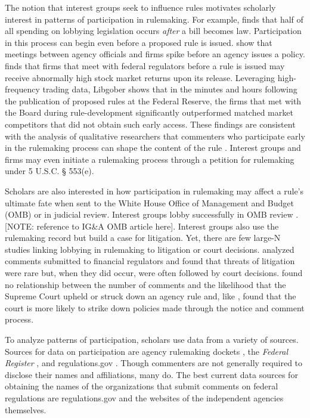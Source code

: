 \documentclass[
      12pt,
        ]{article}
\begin{document}
The notion that interest groups seek to influence rules motivates
scholarly interest in patterns of participation in rulemaking. For
example, \citet{YouJOP2017} finds that half of all spending on lobbying
legislation occurs \emph{after} a bill becomes law. Participation in
this process can begin even before a proposed rule is issued.
\citet{deFigureidoKimICC2004} show that meetings between agency
officials and firms spike before an agency issues a policy.
\citet{LibgoberQJPS} finds that firms that meet with federal regulators
before a rule is issued may receive abnormally high stock market returns
upon its release. Leveraging high-frequency trading data, Libgober shows
that in the minutes and hours following the publication of proposed
rules at the Federal Reserve, the firms that met with the Board during
rule-development significantly outperformed matched market competitors
that did not obtain such early access. These findings are consistent
with the analysis of qualitative researchers that commenters who
participate early in the rulemaking process can shape the content of the
rule \citep{NaughtonJPAM2009}. Interest groups and firms may even
initiate a rulemaking process through a petition for rulemaking under 5
U.S.C. § 553(e).

Scholars are also interested in how participation in rulemaking may
affect a rule's ultimate fate when sent to the White House Office of
Management and Budget (OMB) or in judicial review. Interest groups lobby
successfully in OMB review \citep{HaederYackee2015}. {[}NOTE: reference
to IG\&A OMB article here{]}. Interest groups also use the rulemaking
record but build a case for litigation. Yet, there are few large-N
studies linking lobbying in rulemaking to litigation or court decisions.
\citet{LibgoberRashin2018SPSA} analyzed comments submitted to financial
regulators and found that threats of litigation were rare but, when they
did occur, were often followed by court decisions.
\citet{judgelord2016MPSA} found no relationship between the number of
comments and the likelihood that the Supreme Court upheld or struck down
an agency rule and, like \citet{SchuckElliott1990}, found that the court
is more likely to strike down policies made through the notice and
comment process.

To analyze patterns of participation, scholars use data from a variety
of sources. Sources for data on participation are agency rulemaking
dockets
\citep{GoldenJPART1998, YackeeJPART2006, YoungBP2017, BanBP2019}, the
\emph{Federal Register} \citep{BallaAPSR1998, WestPAR2004}, and
regulations.gov \citep{Balla2019, GordonRashinJOP}. Though commenters
are not generally required to disclose their names and affiliations,
many do. The best current data sources for obtaining the names of the
organizations that submit comments on federal regulations are
regulations.gov and the websites of the independent agencies themselves.
\end{document}
